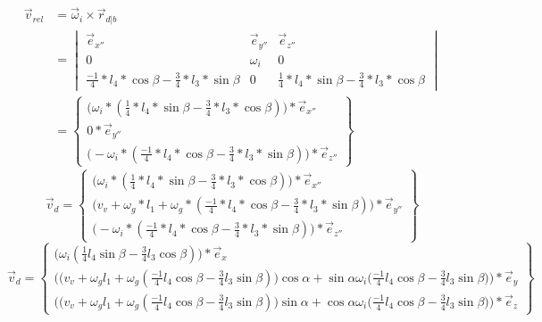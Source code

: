 \documentclass[a4paper,10pt]{article}
\begin{document}
\begin{equation}
\begin{aligned}
\vec{v}_{rel} &= \vec{\omega}_i \times \vec{r}_{d|b} \\
&=\begin{vmatrix}
\vec{e}_{x''} & \vec{e}_{y''} & \vec{e}_{z''}\\
0 & \omega_i & 0 \\
\frac{-1}{4}*l_4*\cos{\beta} - \frac{3}{4}*l_3 * \sin{\beta} & 0 &\frac{1}{4}*l_4 *\sin{\beta}-\frac{3}{4}*l_3 * \cos{\beta}
\end{vmatrix}\\
&= \begin{Bmatrix}
\Big(\omega_i * (\frac{1}{4}*l_4 *\sin{\beta}-\frac{3}{4}*l_3 * \cos{\beta})\Big) * \vec{e}_{x''}\\
0 *\vec{e}_{y''}\\
\Big(-\omega_i *(\frac{-1}{4}*l_4*\cos{\beta} - \frac{3}{4}*l_3 * \sin{\beta}) \Big)*\vec{e}_{z''}
\end{Bmatrix}
\end{aligned}
\end{equation}
\begin{equation}
\vec{v}_d = \begin{Bmatrix}
\Big(\omega_i * (\frac{1}{4}*l_4 *\sin{\beta}-\frac{3}{4}*l_3 * \cos{\beta})\Big) * \vec{e}_{x''}\\
\Big(v_v + \omega_g * l_1 + \omega_g*(\frac{-1}{4}*l_4*\cos{\beta}-\frac{3}{4}*l_3*\sin{\beta}) \Big) *\vec{e}_{y''}\\
\Big(-\omega_i *(\frac{-1}{4}*l_4*\cos{\beta} - \frac{3}{4}*l_3 * \sin{\beta}) \Big)*\vec{e}_{z''}
\end{Bmatrix}
\end{equation}
\begin{equation}
\vec{v}_d = \begin{Bmatrix}
\Big(\omega_i  (\frac{1}{4}l_4 \sin{\beta}-\frac{3}{4}l_3  \cos{\beta})\Big) * \vec{e}_{x}\\
\Big(\big(v_v + \omega_g  l_1 + \omega_g(\frac{-1}{4} l_4 \cos{\beta}-\frac{3}{4} l_3 \sin{\beta}) \big) \cos{\alpha}  + \sin{\alpha}  \omega_i  \big( \frac{-1}{4}l_4 \cos{\beta} - \frac{3}{4}l_3 \sin{\beta}\big)\Big)*\vec{e}_{y} \\
\Big(\big(v_v + \omega_g   l_1 + \omega_g (\frac{-1}{4} l_4 \cos{\beta}-\frac{3}{4} l_3 \sin{\beta}) \big) \sin{\alpha}  + \cos{\alpha}  \omega_i   \big( \frac{-1}{4} l_4 \cos{\beta} - \frac{3}{4}l_3 \sin{\beta}\big)\Big)*\vec{e}_{z}
\end{Bmatrix}
\end{equation}
\end{document}
